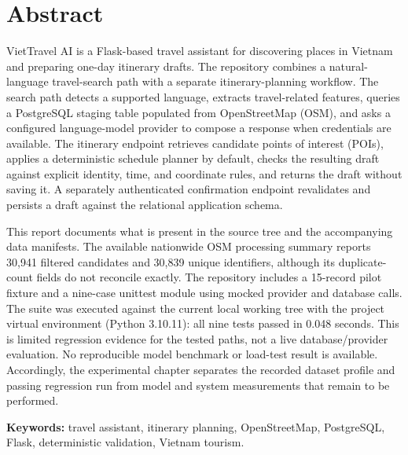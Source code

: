 \documentclass{sicaireport}
\begin{document}
\makecoverpage
\maketitledetailpage

\setcounter{page}{1}

\chapter*{Abstract}
VietTravel AI is a Flask-based travel assistant for discovering places in Vietnam and preparing one-day itinerary drafts. The repository combines a natural-language travel-search path with a separate itinerary-planning workflow. The search path detects a supported language, extracts travel-related features, queries a PostgreSQL staging table populated from OpenStreetMap (OSM), and asks a configured language-model provider to compose a response when credentials are available. The itinerary endpoint retrieves candidate points of interest (POIs), applies a deterministic schedule planner by default, checks the resulting draft against explicit identity, time, and coordinate rules, and returns the draft without saving it. A separately authenticated confirmation endpoint revalidates and persists a draft against the relational application schema.

This report documents what is present in the source tree and the accompanying data manifests. The available nationwide OSM processing summary reports 30,941 filtered candidates and 30,839 unique identifiers, although its duplicate-count fields do not reconcile exactly. The repository includes a 15-record pilot fixture and a nine-case unittest module using mocked provider and database calls. The suite was executed against the current local working tree with the project virtual environment (Python 3.10.11): all nine tests passed in 0.048 seconds. This is limited regression evidence for the tested paths, not a live database/provider evaluation. No reproducible model benchmark or load-test result is available. Accordingly, the experimental chapter separates the recorded dataset profile and passing regression run from model and system measurements that remain to be performed.

\medskip
\noindent\textbf{Keywords:} travel assistant, itinerary planning, OpenStreetMap, PostgreSQL, Flask, deterministic validation, Vietnam tourism.
\clearpage

\renewcommand{\contentsname}{Contents}
\setcounter{tocdepth}{2}
\tableofcontents
\clearpage
\listoffigures
\clearpage
\listoftables
\clearpage
\end{document}
